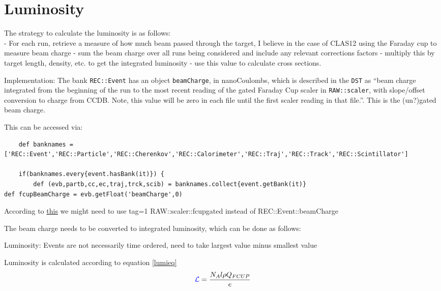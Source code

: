 \section{Luminosity} \label{sec:luminosity}

The strategy to calculate the luminosity is as follows:\\

 - For each run, retrieve a measure of how much beam passed through the target, I believe in the case of CLAS12 using the Faraday cup to measure beam charge
    - sum the beam charge over all runs being considered and include any relevant corrections factors
    - multiply this by target length, density, etc. to get the integrated luminosity
    - use this value to calculate cross sections.



Implementation:
The bank \texttt{REC::Event} has an object \texttt{beamCharge}, in nanoCoulombs, which is described in the \texttt{DST} as ``beam charge integrated from the beginning of the run to the most recent reading of the gated Faraday Cup scaler in \texttt{RAW::scaler}, with slope/offset conversion to charge from CCDB. Note, this value will be zero in each file until the first scaler reading in that file.''. This is the (un?)gated beam charge. 



This can be accessed via:

\begin{lstlisting}
	def banknames = ['REC::Event','REC::Particle','REC::Cherenkov','REC::Calorimeter','REC::Traj','REC::Track','REC::Scintillator']

	if(banknames.every{event.hasBank(it)}) {
		def (evb,partb,cc,ec,traj,trck,scib) = banknames.collect{event.getBank(it)}
def fcupBeamCharge = evb.getFloat('beamCharge',0)
\end{lstlisting}

    According to \href{https://clas12.discourse.group/t/accessing-beam-charge-information/239}{this} we might need to use tag=1 RAW::scaler::fcupgated instead of REC::Event::beamCharge
    

The beam charge needs to be converted to integrated luminosity, which can be done as follows:

Luminosity: Events are not necessarily time ordered, need to take largest value minus smallest value  


Luminosity is calculated according to equation \ref{lumieq}
 \begin{equation}\label{lumieq}
            \textcolor{blue}{ \mathcal{L}} = \frac{N_A l \rho Q_{FCUP}}{e}
\end{equation}

